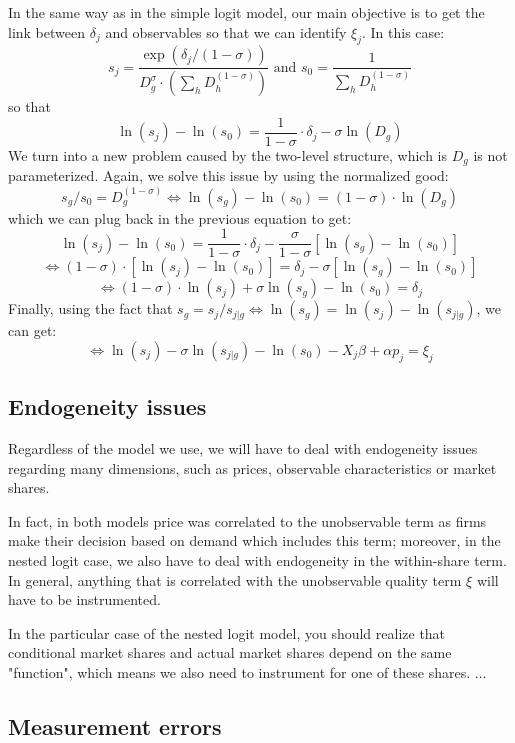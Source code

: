 \documentclass[12pt]{report}
\begin{document}
In the same way as in the simple logit model, our main objective is to get the link between $\delta_j$ and observables so that we can identify $\xi_j$. In this case: $$s_j = \frac{\exp(\delta_j/(1-\sigma))}{D_g^\sigma\cdot\left(\sum_{h} D_h^{(1-\sigma)}\right)} \text{ and } s_0 = \frac{1}{\sum_{h} D_h^{(1-\sigma)}} $$ so that $$\ln(s_j) - \ln(s_0) = \frac{1}{1-\sigma}\cdot \delta_j - \sigma\ln(D_g) $$ We turn into a new problem caused by the two-level structure, which is $D_g$ is not parameterized. Again, we solve this issue by using the normalized good: $$ s_g / s_0 = D_g^{(1-\sigma)} \Leftrightarrow \ln(s_g) - \ln(s_0) = (1-\sigma) \cdot \ln(D_g) $$ which we can plug back in the previous equation to get: $$\ln(s_j) - \ln(s_0) = \frac{1}{1-\sigma}\cdot \delta_j - \frac{\sigma}{1 - \sigma} [ \ln(s_g) - \ln(s_0) ] $$ $$\Leftrightarrow (1 - \sigma) \cdot [\ln(s_j) - \ln(s_0)] = \delta_j - \sigma [ \ln(s_g) - \ln(s_0) ] $$ $$\Leftrightarrow (1 - \sigma) \cdot \ln(s_j) + \sigma \ln(s_g) - \ln(s_0) = \delta_j $$ Finally, using the fact that $s_g = s_j / s_{j\vert g} \Leftrightarrow \ln(s_g) = \ln(s_j) - \ln(s_{j\vert g})$, we can get: $$\Leftrightarrow \ln(s_j) - \sigma \ln(s_{j\vert g}) - \ln(s_0) - X_j\beta + \alpha p_j = \xi_j $$

\subsection{Endogeneity issues}

Regardless of the model we use, we will have to deal with endogeneity issues regarding many dimensions, such as prices, observable characteristics or market shares. 

In fact, in both models price was correlated to the unobservable term as firms make their decision based on demand which includes this term; moreover, in the nested logit case, we also have to deal with endogeneity in the within-share term. In general, anything that is correlated with the unobservable quality term $\xi$ will have to be instrumented.



In the particular case of the nested logit model, you should realize that conditional market shares and actual market shares depend on the same "function", which means we also need to instrument for one of these shares. ...

\subsection{Measurement errors}
\end{document}
